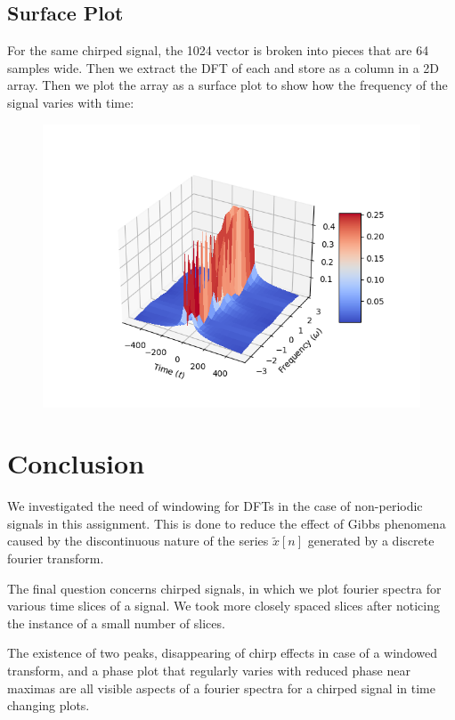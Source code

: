 \documentclass[12pt, a4paper]{article}
\begin{document}
\subsection{Surface Plot}
For the same chirped signal, the 1024 vector is broken into pieces that are 64 samples wide. Then we extract the
DFT of each and store as a column in a 2D array. Then we plot the array as a surface plot to show how the
frequency of the signal varies with time:
\begin{figure}[H]
    \centering
    \includegraphics[scale=0.7]{q6.png}
\end{figure}


\section{Conclusion}
We investigated the need of windowing for DFTs in the case of non-periodic signals in this assignment.
This is done to reduce the effect of Gibbs phenomena caused by the discontinuous nature of the series
$\tilde{x}[n]$ generated by a discrete fourier transform.

The final question concerns chirped signals, in which we plot fourier spectra for various time slices of a
signal. We took more closely spaced slices after noticing the instance of a small number of slices.

The existence of two peaks, disappearing of chirp effects in case of a windowed transform, and a
phase plot that regularly varies with reduced phase near maximas are all visible aspects of a fourier spectra
for a chirped signal in time changing plots.
\end{document}
